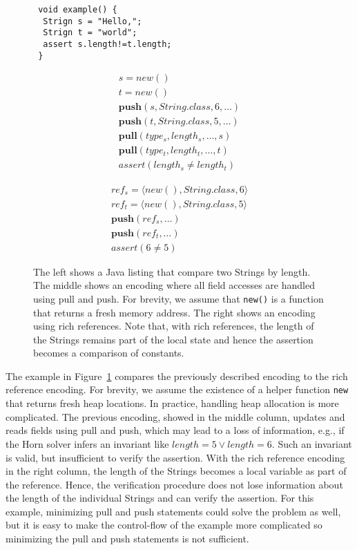 \begin{figure}[ht]
\centering
\begin{minipage}{.3\textwidth}
\begin{lstlisting}
 void example() {
  Strign s = "Hello,";
  Strign t = "world";
  assert s.length!=t.length;
 }
\end{lstlisting}
\end{minipage}
\begin{minipage}{.3\textwidth}
\begin{align*}
s = new() \\
t = new() \\
\textbf{push}(s, String.class, 6, \ldots)\\
\textbf{push}(t, String.class, 5, \ldots)\\
\textbf{pull}(type_s, length_s, \ldots, s)\\
\textbf{pull}(type_t, length_t, \ldots, t)\\
assert (length_s\neq length_t)
\end{align*}
\end{minipage}
\begin{minipage}{.3\textwidth}
\begin{align*}
ref_s = \langle new(), String.class, 6\rangle \\
ref_t = \langle new(), String.class, 5\rangle \\
\textbf{push}(ref_s, \ldots)\\
\textbf{push}(ref_t, \ldots)\\
assert (6 \neq 5)
\end{align*}
\end{minipage}
\caption{The left shows a Java listing that compare two Strings by length. 
The middle shows an encoding where all field accesses are handled
using pull and push. For brevity, we assume that \texttt{new()} is a 
function that returns a fresh memory address. The right shows an encoding
using rich references. Note that, with rich references, the length of the
Strings remains part of the local state and hence the assertion becomes
a comparison of constants.
}
\label{fig-tuple-example}
\end{figure}

The example in Figure~\ref{fig-tuple-example} compares the 
previously described encoding to the rich reference encoding. For brevity,
we assume the existence of a helper function \texttt{new} that returns
fresh heap locations. In practice, handling heap allocation is more complicated. 
The previous encoding, showed in the middle column, updates and
reads fields using pull and push, which may lead to a loss of information, e.g., 
if the Horn solver infers an invariant like $length=5 \vee length=6$. Such an
invariant is valid, but insufficient to verify the assertion. With the rich 
reference encoding in the right column, 
the length of the Strings becomes a local variable as part of the reference.
Hence, the verification procedure does not lose information about the length
of the individual Strings and can verify the assertion. For this example, minimizing pull and push statements could solve the 
problem as well, but it is easy to make the control-flow of the example more
complicated so minimizing the pull and push statements is not sufficient.


